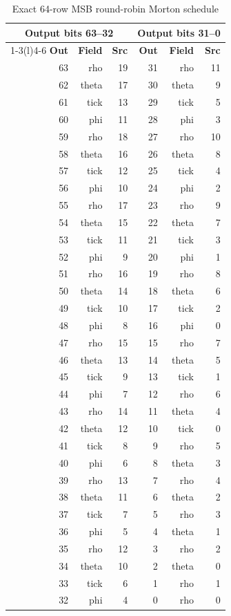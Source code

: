 \begin{table}[H]
\centering
\caption{Exact 64-row MSB round-robin Morton schedule}\label{tab:morton}
\footnotesize
\setlength{\tabcolsep}{5pt}
\renewcommand{\arraystretch}{0.88}
\begin{tabular}{@{}rrr@{\hspace{1.2cm}}rrr@{}}
\toprule
\multicolumn{3}{c}{Output bits 63--32} & \multicolumn{3}{c}{Output bits 31--0} \\
\cmidrule(r){1-3}\cmidrule(l){4-6}
\textbf{Out} & \textbf{Field} & \textbf{Src} & \textbf{Out} & \textbf{Field} & \textbf{Src} \\
\midrule
63 & rho & 19 & 31 & rho & 11 \\
62 & theta & 17 & 30 & theta & 9 \\
61 & tick & 13 & 29 & tick & 5 \\
60 & phi & 11 & 28 & phi & 3 \\
59 & rho & 18 & 27 & rho & 10 \\
58 & theta & 16 & 26 & theta & 8 \\
57 & tick & 12 & 25 & tick & 4 \\
56 & phi & 10 & 24 & phi & 2 \\
55 & rho & 17 & 23 & rho & 9 \\
54 & theta & 15 & 22 & theta & 7 \\
53 & tick & 11 & 21 & tick & 3 \\
52 & phi & 9 & 20 & phi & 1 \\
51 & rho & 16 & 19 & rho & 8 \\
50 & theta & 14 & 18 & theta & 6 \\
49 & tick & 10 & 17 & tick & 2 \\
48 & phi & 8 & 16 & phi & 0 \\
47 & rho & 15 & 15 & rho & 7 \\
46 & theta & 13 & 14 & theta & 5 \\
45 & tick & 9 & 13 & tick & 1 \\
44 & phi & 7 & 12 & rho & 6 \\
43 & rho & 14 & 11 & theta & 4 \\
42 & theta & 12 & 10 & tick & 0 \\
41 & tick & 8 & 9 & rho & 5 \\
40 & phi & 6 & 8 & theta & 3 \\
39 & rho & 13 & 7 & rho & 4 \\
38 & theta & 11 & 6 & theta & 2 \\
37 & tick & 7 & 5 & rho & 3 \\
36 & phi & 5 & 4 & theta & 1 \\
35 & rho & 12 & 3 & rho & 2 \\
34 & theta & 10 & 2 & theta & 0 \\
33 & tick & 6 & 1 & rho & 1 \\
32 & phi & 4 & 0 & rho & 0 \\
\bottomrule
\end{tabular}
\end{table}
